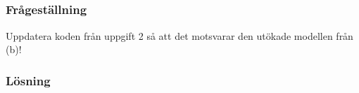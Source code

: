 \subsection{}\label{sec:uppg3c}
\subsubsection*{Frågeställning}
Uppdatera koden från uppgift 2 så att det motsvarar den utökade modellen från
(b)!

\subsubsection*{Lösning}


